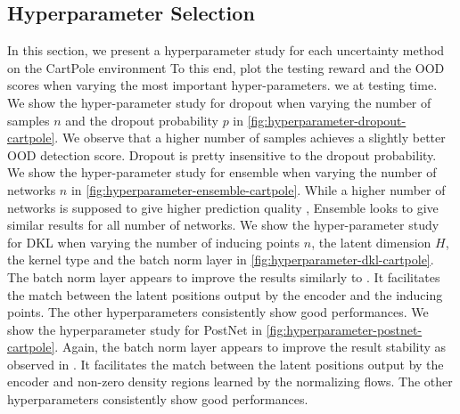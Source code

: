 \subsection{Hyperparameter Selection}
\label{app:hyper-parameter-study}

In this section, we present a hyperparameter study for each uncertainty method on the CartPole environment To this end, plot the testing reward and the OOD scores when varying the most important hyper-parameters. we at testing time. We show the hyper-parameter study for dropout when varying the number of samples $n$ and the dropout probability $p$ in \cref{fig:hyperparameter-dropout-cartpole}. We observe that a higher number of samples achieves a slightly better OOD detection score. Dropout is pretty insensitive to the dropout probability. We show the hyper-parameter study for ensemble when varying the number of networks $n$ in \cref{fig:hyperparameter-ensemble-cartpole}. While a higher number of networks is supposed to give higher prediction quality \cite{ensembles}, Ensemble looks to give similar results for all number of networks. We show the hyper-parameter study for DKL when varying the number of inducing points $n$, the latent dimension $H$, the kernel type and the batch norm layer in \cref{fig:hyperparameter-dkl-cartpole}. The batch norm layer appears to improve the results similarly to \cite{charpentier2020}. It facilitates the match between the latent positions output by the encoder and the inducing points. The other hyperparameters consistently show good performances. We show the hyperparameter study for PostNet in \cref{fig:hyperparameter-postnet-cartpole}. Again, the batch norm layer appears to improve the result stability as observed in \cite{charpentier2020}. It facilitates the match between the latent positions output by the encoder and non-zero density regions learned by the normalizing flows. The other hyperparameters consistently show good performances.





